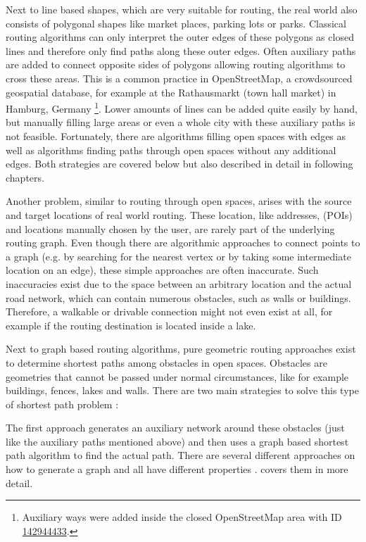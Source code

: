 	Next to line based shapes, which are very suitable for routing, the real world also consists of polygonal shapes like market places, parking lots or parks.
	Classical routing algorithms can only interpret the outer edges of these polygons as closed lines and therefore only find paths along these outer edges.
	Often auxiliary paths are added to connect opposite sides of polygons allowing routing algorithms to cross these areas.
	This is a common practice in OpenStreetMap, a crowdsourced geospatial database, for example at the Rathausmarkt (town hall market) in Hamburg, Germany \footnote{Auxiliary ways were added inside the closed OpenStreetMap area with ID  \href{https://www.openstreetmap.org/way/142944433}{142944433}.}.
	Lower amounts of lines can be added quite easily by hand, but manually filling large areas or even a whole city with these auxiliary paths is not feasible.
	Fortunately, there are algorithms filling open spaces with edges as well as algorithms finding paths through open spaces without any additional edges.
	Both strategies are covered below but also described in detail in following chapters.
	
	Another problem, similar to routing through open spaces, arises with the source and target locations of real world routing.
	These location, like addresses,  (POIs) and locations manually chosen by the user, are rarely part of the underlying routing graph.
	Even though there are algorithmic approaches to connect points to a graph (e.g. by searching for the nearest vertex or by taking some intermediate location on an edge), these simple approaches are often inaccurate.
	Such inaccuracies exist due to the space between an arbitrary location and the actual road network, which can contain numerous obstacles, such as walls or buildings.
	Therefore, a walkable or drivable connection might not even exist at all, for example if the routing destination is located inside a lake.
	
	Next to graph based routing algorithms, pure geometric routing approaches exist to determine shortest paths among obstacles in open spaces.
	Obstacles are geometries that cannot be passed under normal circumstances, like for example buildings, fences, lakes and walls.
	There are two main strategies to solve this type of shortest path problem \cite{hershberger-suri}:
	
	The first approach generates an auxiliary network around these obstacles (just like the auxiliary paths mentioned above) and then uses a graph based shortest path algorithm to find the actual path.
	There are several different approaches on how to generate a graph and all have different properties \cite{graser-osm-open-spaces}.
	 covers them in more detail.
	
